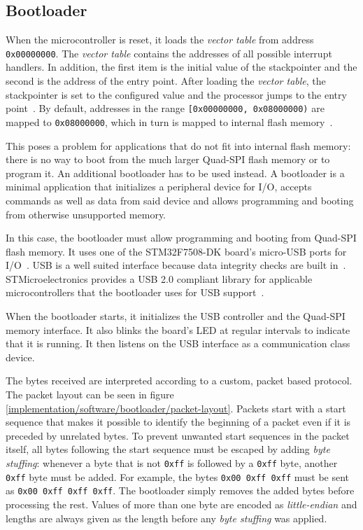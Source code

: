 \subsection{Bootloader}
\label{implementation/software/bootloader}

When the microcontroller is reset, it loads the \textit{vector table} from address \mbox{\lstinline{0x00000000}.}
The \textit{vector table} contains the addresses of all possible interrupt handlers. In addition, the
first item is the initial value of the stackpointer and the second is the address of the entry point.
After loading the \textit{vector table}, the stackpointer is set to the configured value and the
processor jumps to the entry point~\cite{mcu-ref-manual}. By default, addresses in the range
\lstinline{[0x00000000, 0x08000000)} are mapped to \lstinline{0x08000000}, which in turn is mapped
to internal flash memory~\cite{mcu-ref-manual}.

This poses a problem for applications that do not fit into internal flash memory: there is no way to
boot from the much larger Quad-SPI flash memory or to program it. An additional bootloader has to be
used instead. A bootloader is a minimal application that initializes a peripheral device for I/O,
accepts commands as well as data from said device and allows programming and booting from otherwise
unsupported memory.

In this case, the bootloader must allow programming and booting from Quad-SPI flash memory. It uses
one of the STM32F7508-DK board's micro-USB ports for I/O~\cite{board-user-manual}. USB is a well
suited interface because data integrity checks are built in~\cite{usb-2-spec}. STMicroelectronics
provides a USB 2.0 compliant library for applicable microcontrollers that the bootloader uses for
USB support~\cite{stm32-usb-lib}.

When the bootloader starts, it initializes the USB controller and the Quad-SPI memory interface. It
also blinks the board's LED at regular intervals to indicate that it is running. It then listens on
the USB interface as a communication class device.

The bytes received are interpreted according to a custom, packet based protocol. The packet layout
can be seen in figure \ref{implementation/software/bootloader/packet-layout}. Packets start with a
start sequence that makes it possible to identify the beginning of a packet even if it is preceded
by unrelated bytes. To prevent unwanted start sequences in the packet itself, all bytes following
the start sequence must be escaped by adding \textit{byte stuffing}: whenever a byte that is not
\lstinline{0xff} is followed by a \lstinline{0xff} byte, another \lstinline{0xff} byte must be added.
For example, the bytes \lstinline{0x00 0xff 0xff} must be sent as \lstinline{0x00 0xff 0xff 0xff}.
The bootloader simply removes the added bytes before processing the rest. Values of more than one
byte are encoded as \textit{little-endian} and lengths are always given as the length before any
\textit{byte stuffing} was applied.

